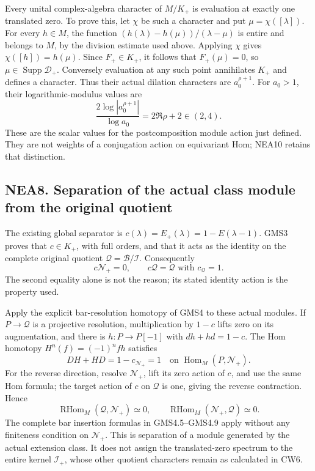 Every unital complex-algebra character of \(M/K_+\) is evaluation at
exactly one translated zero. To prove this, let \(\chi\) be such a
character and put \(\mu=\chi([\lambda])\). For every \(h\in M\), the
function \((h(\lambda)-h(\mu))/(\lambda-\mu)\) is entire and belongs to
\(M\), by the division estimate used above. Applying \(\chi\) gives
\(\chi([h])=h(\mu)\). Since \(F_+\in K_+\), it follows that
\(F_+(\mu)=0\), so \(\mu\in\operatorname{Supp}\mathscr D_+\). Conversely
evaluation at any such point annihilates \(K_+\) and defines a
character. Thus their actual dilation characters are \(a_0^{\rho+1}\).
For \(a_0>1\), their logarithmic-modulus values are \[
\frac{2\log|a_0^{\rho+1}|}{\log a_0}
=2\Re\rho+2\in(2,4).
\tag{NEA7.7}
\] These are the scalar values for the postcomposition module action
just defined. They are not weights of a conjugation action on
equivariant Hom; NEA10 retains that distinction.

\subsection{NEA8. Separation of the actual class module from the
original
quotient}\label{nea8.-separation-of-the-actual-class-module-from-the-original-quotient}

The existing global separator is
\(c(\lambda)=E_+(\lambda)=1-E(\lambda-1)\). GMS3 proves that
\(c\in K_+\), with full orders, and that it acts as the identity on the
complete original quotient \(\mathcal Q=\mathcal B/\mathcal I\).
Consequently \[
c\mathscr N_+=0,\qquad c\mathcal Q=\mathcal Q
\text{ with }c_{\mathcal Q}=1.
\tag{NEA8.1}
\] The second equality alone is not the reason; its stated identity
action is the property used.

Apply the explicit bar-resolution homotopy of GMS4 to these actual
modules. If \(P\to\mathcal Q\) is a projective resolution,
multiplication by \(1-c\) lifts zero on its augmentation, and there is
\(h:P\to P[-1]\) with \(dh+hd=1-c\). The Hom homotopy
\(H^n(f)=(-1)^nfh\) satisfies \[
DH+HD=1-c_{\mathscr N_+}=1
\quad\text{on }\operatorname{Hom}_M(P,\mathscr N_+).
\tag{NEA8.2}
\] For the reverse direction, resolve \(\mathscr N_+\), lift its zero
action of \(c\), and use the same Hom formula; the target action of
\(c\) on \(\mathcal Q\) is one, giving the reverse contraction. Hence \[
\boxed{\operatorname{RHom}_M(\mathcal Q,\mathscr N_+)\simeq0,
\qquad\operatorname{RHom}_M(\mathscr N_+,\mathcal Q)\simeq0.}
\tag{NEA8.3}
\] The complete bar insertion formulas in GMS4.5--GMS4.9 apply without
any finiteness condition on \(\mathscr N_+\). This is separation of a
module generated by the actual extension class. It does not assign the
translated-zero spectrum to the entire kernel \(\mathcal I_+\), whose
other quotient characters remain as calculated in CW6.

